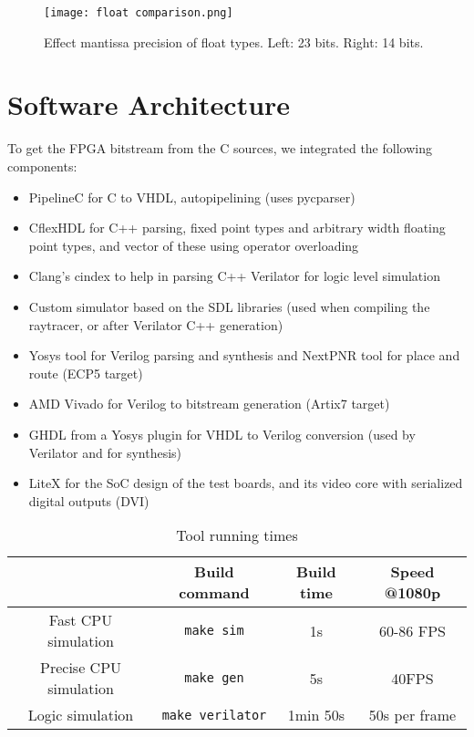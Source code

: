 \documentclass[conference]{IEEEtran}
\begin{document}
\begin{figure}
\texttt{[image: float comparison.png]}
\caption{Effect mantissa precision of float types. Left: 23 bits. Right: 14 bits.}
\label{figprec}
\end{figure}

\section{Software Architecture}

To get the FPGA bitstream from the C sources, we integrated the following components:

\begin{itemize}
\item PipelineC for C to VHDL, autopipelining (uses pycparser\cite{pycparser})
\item CflexHDL for C++ parsing, fixed point types and arbitrary width floating point types, and vector of these using operator overloading
\item Clang’s cindex\cite{cindex} to help in parsing C++
Verilator for logic level simulation
\item Custom simulator based on the SDL\cite{sdllib} libraries (used when compiling the raytracer, or after Verilator C++ generation)
\item Yosys\cite{yosys} tool for Verilog parsing and synthesis and NextPNR\cite{nextpnr} tool for place and route (ECP5 target)
\item AMD Vivado for Verilog to bitstream generation (Artix7 target)
\item GHDL\cite{GHDL} from a Yosys plugin\cite{ghdlplugin} for VHDL to Verilog conversion (used by Verilator and for synthesis)
\item LiteX\cite{litex} for the SoC design of the test boards, and its video core with serialized digital outputs (DVI)
\end{itemize}

\begin{table}
\caption{Tool running times}
\begin{center}
\begin{tabular}{|c|c|c|c|}
\hline & \textbf{Build command}&  \textbf{Build time}& \textbf{Speed @1080p} \\
\hline Fast CPU simulation & \texttt{make sim} & 1s & 60-86 FPS \\
\hline Precise CPU simulation & \texttt{make gen} & 5s & 40FPS \\
\hline Logic simulation & \texttt{make verilator} & 1min 50s & 50s per frame \\
\hline
\end{tabular}
\label{tabtimings}
\end{center}
\end{table}
\end{document}

